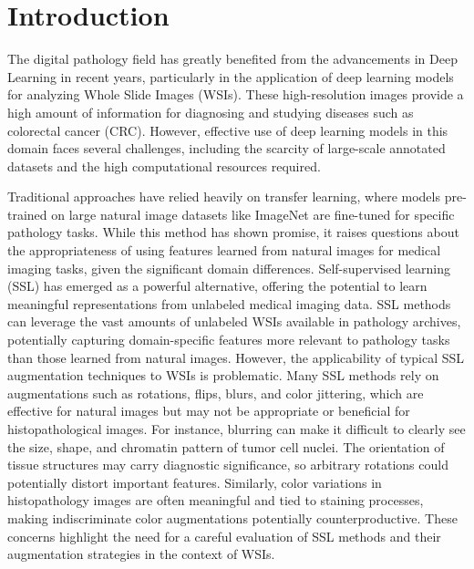 \documentclass[peerreview]{IEEEtran}
\begin{document}
\section{Introduction}
\label{sec:introduction}
The digital pathology field has greatly benefited from the advancements in Deep Learning in recent years, particularly in the application of deep learning models for analyzing Whole Slide Images (WSIs). These high-resolution images provide a high amount of information for diagnosing and studying diseases such as colorectal cancer (CRC). However, effective use of deep learning models in this domain faces several challenges, including the scarcity of large-scale annotated datasets and the high computational resources required.

Traditional approaches have relied heavily on transfer learning, where models pre-trained on large natural image datasets like ImageNet\cite{imagenet} are fine-tuned for specific pathology tasks. While this method has shown promise, it raises questions about the appropriateness of using features learned from natural images for medical imaging tasks, given the significant domain differences. Self-supervised learning (SSL) has emerged as a powerful alternative, offering the potential to learn meaningful representations from unlabeled medical imaging data. SSL methods can leverage the vast amounts of unlabeled WSIs available in pathology archives, potentially capturing domain-specific features more relevant to pathology tasks than those learned from natural images\cite{survey}. However, the applicability of typical SSL augmentation techniques to WSIs is problematic. Many SSL methods rely on augmentations such as rotations, flips, blurs, and color jittering, which are effective for natural images but may not be appropriate or beneficial for histopathological images. For instance, blurring can make it difficult to clearly see the size, shape, and chromatin pattern of tumor cell nuclei. The orientation of tissue structures may carry diagnostic significance, so arbitrary rotations could potentially distort important features. Similarly, color variations in histopathology images are often meaningful and tied to staining processes, making indiscriminate color augmentations potentially counterproductive. These concerns highlight the need for a careful evaluation of SSL methods and their augmentation strategies in the context of WSIs.
\end{document}
